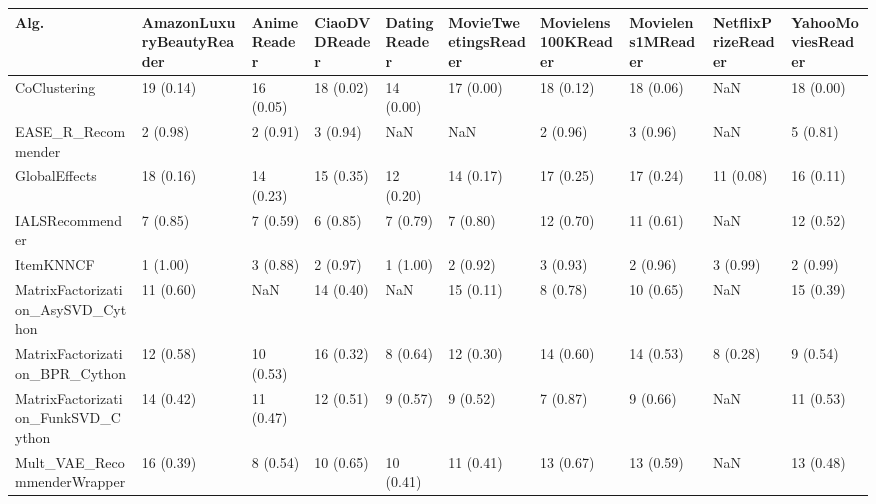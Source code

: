 \begin{tabular}{llllllllll}
\toprule
                               Alg. & AmazonLuxuryBeautyReader & AnimeReader & CiaoDVDReader & DatingReader & MovieTweetingsReader & Movielens100KReader & Movielens1MReader & NetflixPrizeReader & YahooMoviesReader \\
\midrule
                       CoClustering &                19 (0.14) &   16 (0.05) &     18 (0.02) &    14 (0.00) &            17 (0.00) &           18 (0.12) &         18 (0.06) &                NaN &         18 (0.00) \\
                 EASE\_R\_Recommender &                 2 (0.98) &    2 (0.91) &      3 (0.94) &          NaN &                  NaN &            2 (0.96) &          3 (0.96) &                NaN &          5 (0.81) \\
                      GlobalEffects &                18 (0.16) &   14 (0.23) &     15 (0.35) &    12 (0.20) &            14 (0.17) &           17 (0.25) &         17 (0.24) &          11 (0.08) &         16 (0.11) \\
                    IALSRecommender &                 7 (0.85) &    7 (0.59) &      6 (0.85) &     7 (0.79) &             7 (0.80) &           12 (0.70) &         11 (0.61) &                NaN &         12 (0.52) \\
                          ItemKNNCF &                 1 (1.00) &    3 (0.88) &      2 (0.97) &     1 (1.00) &             2 (0.92) &            3 (0.93) &          2 (0.96) &           3 (0.99) &          2 (0.99) \\
  MatrixFactorization\_AsySVD\_Cython &                11 (0.60) &         NaN &     14 (0.40) &          NaN &            15 (0.11) &            8 (0.78) &         10 (0.65) &                NaN &         15 (0.39) \\
     MatrixFactorization\_BPR\_Cython &                12 (0.58) &   10 (0.53) &     16 (0.32) &     8 (0.64) &            12 (0.30) &           14 (0.60) &         14 (0.53) &           8 (0.28) &          9 (0.54) \\
 MatrixFactorization\_FunkSVD\_Cython &                14 (0.42) &   11 (0.47) &     12 (0.51) &     9 (0.57) &             9 (0.52) &            7 (0.87) &          9 (0.66) &                NaN &         11 (0.53) \\
        Mult\_VAE\_RecommenderWrapper &                16 (0.39) &    8 (0.54) &     10 (0.65) &    10 (0.41) &            11 (0.41) &           13 (0.67) &         13 (0.59) &                NaN &         13 (0.48) \\

\end{tabular}
